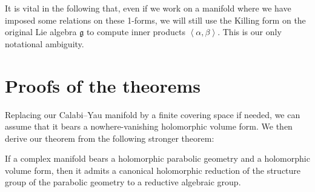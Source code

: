 \documentclass[pdftex]{sigma}
\newcommand{\gtot}{\mathfrak{g}}
\begin{document}
It is vital in the following that, even if we
work on a manifold where we have imposed some
relations on these 1-forms, we will still use the
Killing form on the original Lie algebra $\gtot$
to compute inner products $\left<\alpha,\beta\right>$.
This is our only notational ambiguity.

\section{Proofs of the theorems}

Replacing our Calabi--Yau manifold by a f\/inite covering space
if needed, we can assume that it
bears a nowhere-vanishing holomorphic volume
form. We then derive our theorem from the following stronger theorem:

\begin{theorem}\label{theorem:Reduction}
If a complex manifold bears a holomorphic parabolic geometry
and a holomorphic volume form, then it admits a canonical
holomorphic reduction of the structure group of the parabolic
geometry to a reductive algebraic group.
\end{theorem}
\end{document}
